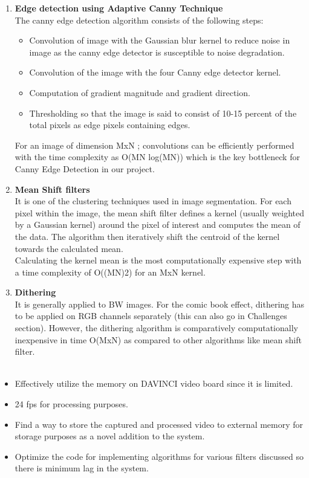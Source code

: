 \documentclass{article}
\begin{document}
\begin{enumerate}
\item {\bf{Edge detection using Adaptive Canny Technique}}\\
The canny edge detection algorithm consists of the following steps:
\begin{itemize}
\item Convolution of image with the Gaussian blur kernel to reduce noise in image as the canny edge detector is susceptible to noise degradation.
\item Convolution of the image with the four Canny edge detector kernel.
\item Computation of gradient magnitude and gradient direction.
\item Thresholding so that the image is said to consist of 10-15 percent of the total pixels as edge pixels containing edges.
\end{itemize}
For an image of dimension MxN ; convolutions can be efficiently performed with the time complexity as O(MN log(MN)) which is the key bottleneck for Canny Edge Detection in our project.
\item {\bf{Mean Shift filters}}\\
It is one of the clustering techniques used in image segmentation. For each pixel within the image, the mean shift filter defines a kernel (usually weighted by a Gaussian kernel) around the pixel of interest and computes the mean of the data. The algorithm then iteratively shift the centroid of the kernel towards the calculated mean.\\
Calculating the kernel mean is the most computationally expensive step with a time complexity of O((MN)2) for an MxN kernel.\\
\item {\bf{Dithering}}\\
It is generally applied to BW images. For the comic book effect, dithering has to be applied on RGB channels separately (this can also go in Challenges section). However, the dithering algorithm is comparatively computationally inexpensive in time O(MxN) as compared to other algorithms like mean shift filter.\\\\
\end{enumerate}


\begin{itemize}
\item Effectively utilize the memory on DAVINCI video board since it is limited.
\item 24 fps for processing purposes.
\item Find a way to store the captured and processed video to external memory for storage purposes as a novel addition to the system.
\item Optimize the code for implementing algorithms for various filters discussed so there is minimum lag in the system.
\end{itemize}
\end{document}
